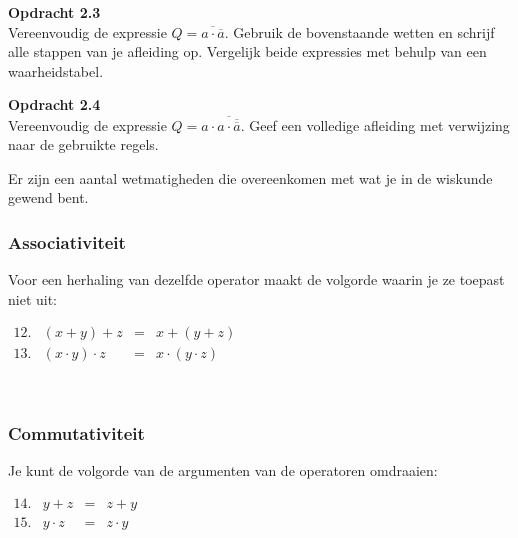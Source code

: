\documentclass[11pt,a5paper]{report}
\begin{document}
\begin{framed}
\textbf{Opdracht 2.3}\\
Vereenvoudig de expressie $Q = \overline{a \cdot \overline{a}}$. Gebruik de bovenstaande wetten en schrijf alle stappen van je afleiding op. Vergelijk beide expressies met behulp van een waarheidstabel.
\end{framed}

\begin{framed}
\textbf{Opdracht 2.4}\\
Vereenvoudig de expressie $Q = a \cdot \overline{a \cdot \overline{\overline{a}}}$. Geef een volledige afleiding met verwijzing naar de gebruikte regels.
\end{framed}

Er zijn een aantal wetmatigheden die overeenkomen met wat je in de wiskunde gewend bent.

\subsubsection*{Associativiteit}


\begin{minipage}[t]{0.45\textwidth}
Voor een herhaling van dezelfde operator maakt de volgorde waarin je ze toepast niet uit:
\end{minipage}%
\hfill
\begin{minipage}[t]{0.53\textwidth}
\vspace*{-1em}
\(
\begin{array}{lccc}
12. & (x + y) + z &=& x + (y + z) \\
13. & (x \cdot y) \cdot z &=& x \cdot (y \cdot z)
\end{array}
\)
\end{minipage}\\

\subsubsection*{Commutativiteit}

\begin{minipage}[t]{0.45\textwidth}
Je kunt de volgorde van de argumenten van de operatoren omdraaien:
\end{minipage}%
\hfill
\begin{minipage}[t]{0.53\textwidth}
\vspace*{-1em}
\(
\begin{array}{lccc}
14. & y + z &=& z + y \\
15. & y \cdot z &=& z \cdot y
\end{array}
\)
\end{minipage}\\
\end{document}
